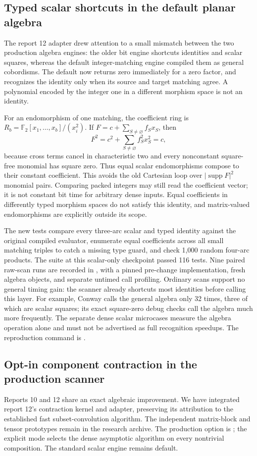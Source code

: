 \subsection{Typed scalar shortcuts in the default planar algebra}
The report 12 adapter drew attention to a small mismatch between the two
production algebra engines: the older bit engine shortcuts identities
and scalar squares, whereas the default integer-matching engine compiled
them as general cobordisms. The default  now returns
zero immediately for a zero factor, and recognizes the identity only
when its source and target matching agree. A polynomial encoded by the
integer one in a different morphism space is not an identity.

For an endomorphism of one matching, the coefficient ring is
$R_b=\mathbb F_2[x_1,\ldots,x_b]/(x_i^2)$. If
$F=c+\sum_{S\ne\varnothing}f_Sx_S$, then
\[
 F^2=c^2+\sum_{S\ne\varnothing}f_S^2x_S^2=c,
\]
because cross terms cancel in characteristic two and every nonconstant
square-free monomial has square zero. Thus equal scalar endomorphisms
compose to their constant coefficient. This avoids the old Cartesian
loop over $|\operatorname{supp}F|^2$ monomial pairs. Comparing packed
integers may still read the coefficient vector; it is not constant bit
time for arbitrary dense inputs. Equal coefficients in differently
typed morphism spaces do not satisfy this identity, and matrix-valued
endomorphisms are explicitly outside its scope.

The new tests compare every three-arc scalar and typed identity against
the original compiled evaluator, enumerate equal coefficients across
all small matching triples to catch a missing type guard, and check
1,000 random four-arc products. The suite at this scalar-only checkpoint
passed 116 tests.
Nine paired raw-scan runs are recorded in
, with a pinned
pre-change implementation, fresh algebra objects, and separate untimed
call profiling. Ordinary scans support no general timing gain: the
scanner already shortcuts most identities before calling this layer.
For example, Conway calls the general algebra only 32 times, three of
which are scalar squares; its exact square-zero debug checks call the
algebra much more frequently. The separate dense scalar microcases
measure the algebra operation alone and must not be advertised as full
recognition speedups. The reproduction command is
.

\subsection{Opt-in component contraction in the production scanner}
Reports 10 and 12 share an exact algebraic improvement. We have integrated
report 12's contraction kernel and adapter, preserving its attribution
to the established fast subset-convolution algorithm. The independent
matrix-block and tensor prototypes remain in the research archive.
The production option is ; the explicit
 mode selects the dense asymptotic algorithm on
every nontrivial composition. The standard scalar engine remains default.

